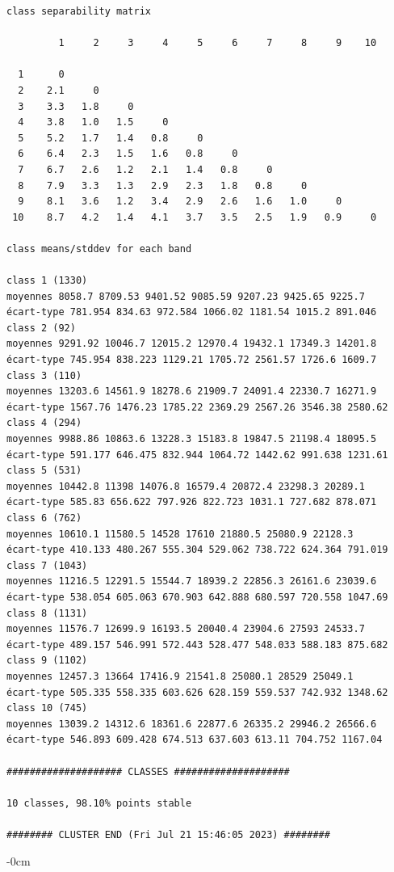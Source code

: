 \documentclass[environments,article,submit,pdftex,moreauthors]{Definitions/mdpi}
\begin{document}
\begin{scriptsize}
\begin{verbatim}
class separability matrix

         1     2     3     4     5     6     7     8     9    10

  1      0
  2    2.1     0
  3    3.3   1.8     0
  4    3.8   1.0   1.5     0
  5    5.2   1.7   1.4   0.8     0
  6    6.4   2.3   1.5   1.6   0.8     0
  7    6.7   2.6   1.2   2.1   1.4   0.8     0
  8    7.9   3.3   1.3   2.9   2.3   1.8   0.8     0
  9    8.1   3.6   1.2   3.4   2.9   2.6   1.6   1.0     0
 10    8.7   4.2   1.4   4.1   3.7   3.5   2.5   1.9   0.9     0

class means/stddev for each band

class 1 (1330)
moyennes 8058.7 8709.53 9401.52 9085.59 9207.23 9425.65 9225.7
écart-type 781.954 834.63 972.584 1066.02 1181.54 1015.2 891.046
class 2 (92)
moyennes 9291.92 10046.7 12015.2 12970.4 19432.1 17349.3 14201.8
écart-type 745.954 838.223 1129.21 1705.72 2561.57 1726.6 1609.7
class 3 (110)
moyennes 13203.6 14561.9 18278.6 21909.7 24091.4 22330.7 16271.9
écart-type 1567.76 1476.23 1785.22 2369.29 2567.26 3546.38 2580.62
class 4 (294)
moyennes 9988.86 10863.6 13228.3 15183.8 19847.5 21198.4 18095.5
écart-type 591.177 646.475 832.944 1064.72 1442.62 991.638 1231.61
class 5 (531)
moyennes 10442.8 11398 14076.8 16579.4 20872.4 23298.3 20289.1
écart-type 585.83 656.622 797.926 822.723 1031.1 727.682 878.071
class 6 (762)
moyennes 10610.1 11580.5 14528 17610 21880.5 25080.9 22128.3
écart-type 410.133 480.267 555.304 529.062 738.722 624.364 791.019
class 7 (1043)
moyennes 11216.5 12291.5 15544.7 18939.2 22856.3 26161.6 23039.6
écart-type 538.054 605.063 670.903 642.888 680.597 720.558 1047.69
class 8 (1131)
moyennes 11576.7 12699.9 16193.5 20040.4 23904.6 27593 24533.7
écart-type 489.157 546.991 572.443 528.477 548.033 588.183 875.682
class 9 (1102)
moyennes 12457.3 13664 17416.9 21541.8 25080.1 28529 25049.1
écart-type 505.335 558.335 603.626 628.159 559.537 742.932 1348.62
class 10 (745)
moyennes 13039.2 14312.6 18361.6 22877.6 26335.2 29946.2 26566.6
écart-type 546.893 609.428 674.513 637.603 613.11 704.752 1167.04

#################### CLASSES ####################

10 classes, 98.10% points stable

######## CLUSTER END (Fri Jul 21 15:46:05 2023) ########
\end{verbatim}
\end{scriptsize}

\let\cleardoublepage\clearpage

\begin{adjustwidth}{-\extralength}{0cm}




\end{adjustwidth}
\end{document}
